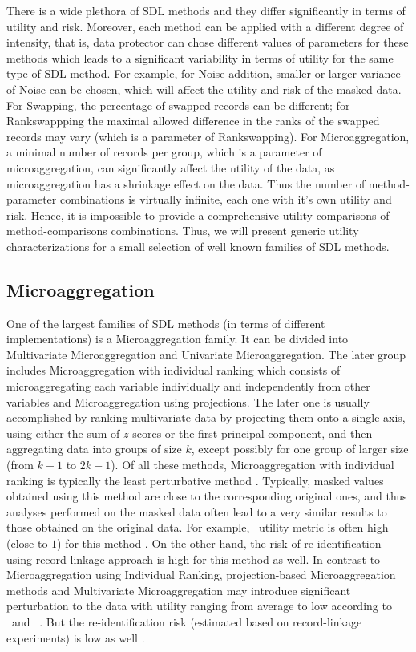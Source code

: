 There is a wide plethora of SDL methods and they differ significantly in terms of utility  and risk. Moreover, each method can be applied with a different degree of intensity, that is, data protector can chose  different values of parameters for these methods which leads to a significant variability in terms of utility for the same type of SDL method. 
For example, for Noise addition, smaller or larger variance of Noise can be chosen, which will affect the utility and risk of the masked data. For Swapping, the percentage of swapped records can be different; for Rankswappping  the  maximal allowed difference in the ranks of the swapped records  may vary (which is a parameter of Rankswapping). For Microaggregation, a minimal number of records per group, which is a parameter of microaggregation, can significantly affect the utility of the data, as microaggregation has a shrinkage effect on the data. Thus the number of method-parameter combinations is virtually infinite, each one with it's own utility and risk. Hence, it is impossible to provide a comprehensive utility comparisons of method-comparisons combinations. Thus, we will present generic utility characterizations for a small selection of well known families of SDL methods. 

\subsection{Microaggregation}
One of the largest families of SDL methods (in terms of different  implementations) is a  Microaggregation family. It can   be divided into Multivariate Microaggregation   and  Univariate Microaggregation. The later group includes Microaggregation with individual ranking which consists of microaggregating each variable individually and independently from other variables and Microaggregation using projections. The later one is usually accomplished by ranking  multivariate data by projecting them onto a single axis, using either the sum of $z$-scores or the first principal component, and then aggregating data into groups of size $k$, except possibly for one group of larger size (from $k+1$ to $2k -1$).
Of all these methods, Microaggregation with individual ranking is typically the least perturbative method \citep{kkors06}. Typically, masked values obtained using this method are close to the corresponding original ones, and thus analyses performed on the masked data often lead to a very similar results to those obtained on the original data. For example, \EO\ utility metric is often high (close to $1$)  for this method \citep{kkors06}. On the other hand, the risk of re-identification using record linkage approach is high for this method as well. 
In contrast to Microaggregation using Individual Ranking, projection-based Microaggregation methods and Multivariate Microaggregation may introduce significant perturbation to the data with utility ranging from average to low according to \IO\ and \EO\ . But the re-identification risk (estimated based on record-linkage experiments) is low as well \citep{}. 

